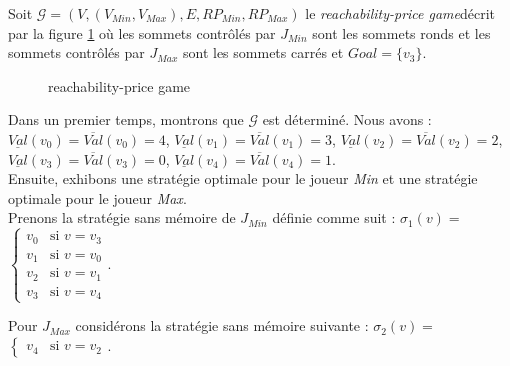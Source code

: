 
\begin{exemple}
	Soit $\mathcal{G} = (V,(V_{Min},V_{Max}),E,RP_{Min},RP_{Max})$ le \og\textit{reachability-price game}\fg décrit par la figure \ref{ex:reachPriceGame1} où les sommets contrôlés par $J_{Min}$ sont les sommets ronds et les sommets contrôlés par $J_{Max}$ sont les sommets carrés et $Goal = \{ v_{3} \}$.
	
	\begin{figure}[ht!]
		\centering



		\caption{reachability-price game}
		\label{ex:reachPriceGame1}


	\end{figure}
	
Dans un premier temps, montrons que $\mathcal{G}$ est déterminé. Nous avons : $\underline{Val}(v_{0})=\overline{Val}(v_{0})=4$,  $\underline{Val}(v_{1})=\overline{Val}(v_{1}) =3$, $\underline{Val}(v_{2})=\overline{Val}(v_{2})= 2$,  $\underline{Val}(v_{3})=\overline{Val}(v_{3})= 0$, $\underline{Val}(v_{4})=\overline{Val}(v_{4})= 1$.\\


Ensuite, exhibons une stratégie optimale pour le joueur \textit{Min} et une stratégie optimale pour le joueur \textit{Max}.\\

\noindent Prenons la stratégie sans mémoire de $J_{Min}$ définie comme suit : $\sigma _{1}(v) = $ $\begin{cases}
																						v_{0} & \text{si }v = v_{3}\\
																						v_{1} & \text{si }v = v_{0}\\
																						v_{2} & \text{si }v = v_{1}\\
																						v_{3} & \text{si }v = v_{4}
																					\end{cases}$.

\noindent Pour $J_{Max}$ considérons la stratégie sans mémoire suivante : 																					$\sigma _{2}(v) = $ $\begin{cases}
					v_{4} & \text{si } v = v_{2}
																																										
																																										\end{cases}$.
						
\end{exemple}
